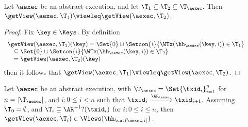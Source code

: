 \begin{lemma}
\label{lem:getView.monotone}
Let $\aexec$ be an abstract execution, and let $\T_1 \subseteq \T_2 \subseteq \T_{\aexec}$. 
Then $\getView(\aexec, \T_1) \viewleq \getView(\aexec, \T_2)$.
\end{lemma}
\begin{proof}
Fix $\key \in \Keys$. By definition  
\[
\begin{array}{l}
    \getView(\aexec, \T_1)(\key) = \Set{0} \cup \Setcon{ i }{\WTx(\hh_{\aexec}(\key, i)) \in \T_1} \\
    \quad \subseteq \Set{0} \cup \Setcon{i }{ \WTx(\hh_{\aexec}(\key, i)) \in \T_2} \\
\quad = \getView(\aexec, \T_2)(\key)
\end{array}
\]
then it follows that  $\getView(\aexec, \T_1) \viewleq \getView(\aexec, \T_2)$.
\end{proof}

\begin{lemma}
\label{lem:cut.views}
Let $\aexec$ be an abstract execution, with $\T_{\aexec} = \Set{\txid_{i}}_{i = 1}^{n}$ for 
$n = \lvert \T_{\aexec} \rvert$, and \( i : 0 \leq i < n\) such that $\txid_{i} \xrightarrow{\AR_{\aexec}} \txid_{i+1}$.
Assuming $\T_{0} = \emptyset$, and $\T_{i} \subseteq \AR^{-1}?(\txid_{i})$ for $i : 0 \leq i \leq n$,
then $\getView(\aexec, \T_{i}) \in \Views(\hh_{\cut(\aexec, i)})$.
\end{lemma}

